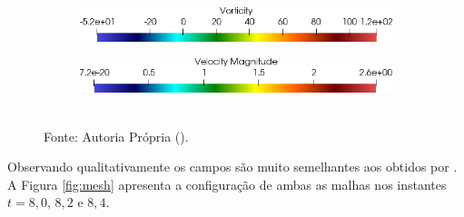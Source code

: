 \begin{figure}[h!]
\begin{subfigure}{.45\linewidth}
    \end{subfigure}
    \caption*{Instante $t=8,8$.}
    \begin{subfigure}{.45\linewidth}
        \centering
        \includegraphics[width=\linewidth]{Figuras/rotating-airfoil/lvort.png}
    \end{subfigure}
    \begin{subfigure}{.45\linewidth}
        \centering
        \includegraphics[width=\linewidth]{Figuras/rotating-airfoil/lstr.png}
    \end{subfigure}
    \\Fonte: Autoria Própria (\the\year).
    \label{fig:vort}
\end{figure}

Observando qualitativamente os campos são muito semelhantes aos obtidos por . A Figura \ref{fig:mesh} apresenta a configuração de ambas as malhas nos instantes $t=8,0$, $8,2$ e $8,4$.

